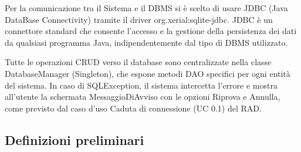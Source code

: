 \documentclass[12pt,a4paper]{article}
\begin{document}
Per la comunicazione tra il Sistema e il DBMS si è scelto di usare JDBC (Java DataBase Connectivity) tramite il driver org.xerial:sqlite-jdbc. JDBC è un connettore standard che consente l'accesso e la gestione della persistenza dei dati da qualsiasi programma Java, indipendentemente dal tipo di DBMS utilizzato.

Tutte le operazioni CRUD verso il database sono centralizzate nella classe DatabaseManager (Singleton), che espone metodi DAO specifici per ogni entità del sistema. In caso di SQLException, il sistema intercetta l'errore e mostra all'utente la schermata MessaggioDiAvviso con le opzioni Riprova e Annulla, come previsto dal caso d'uso Caduta di connessione (UC 0.1) del RAD.

\subsection{Definizioni preliminari}
\end{document}
